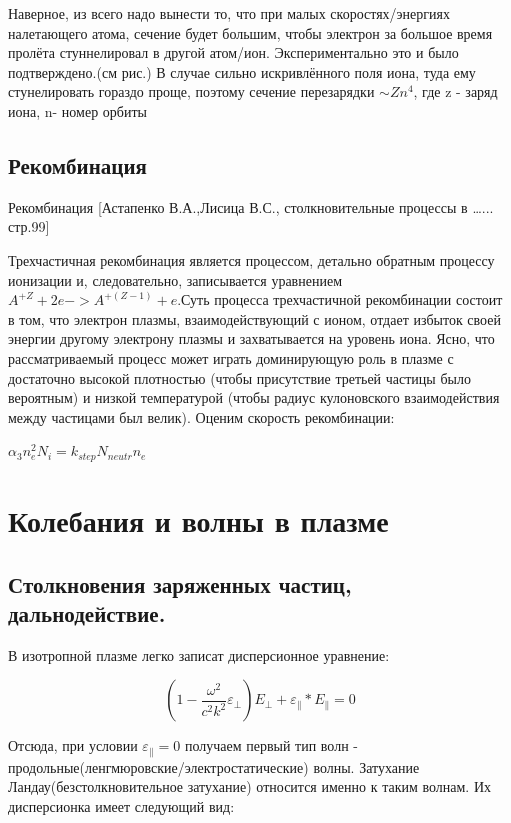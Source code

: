 \documentclass[10pt, a4paper]{article}
\begin{document}
Наверное, из всего надо вынести то, что при малых скоростях/энергиях налетающего атома, сечение будет большим, чтобы электрон за большое время пролёта стуннелировал в другой атом/ион. Экспериментально это и было подтверждено.(см рис.) В случае сильно искривлённого поля иона, туда ему стунелировать гораздо проще, поэтому сечение перезарядки $\sim Zn^{4}$, где z - заряд иона, n- номер орбиты

\subsection{Рекомбинация}
\label{sec.2.6}
Рекомбинация [Астапенко В.А.,Лисица В.С., столкновительные процессы в …... стр.99]


Трехчастичная рекомбинация является процессом, детально обратным процессу ионизации и, следовательно, записывается уравнением $A^{+Z} + 2e -> A^{+(Z-1)} + e $.Суть процесса трехчастичной рекомбинации состоит в том, что электрон плазмы, взаимодействующий с ионом, отдает избыток своей энергии другому электрону плазмы и захватывается на  уровень иона. Ясно, что рассматриваемый процесс может играть доминирующую роль в плазме с достаточно высокой плотностью (чтобы присутствие третьей частицы было вероятным) и низкой температурой (чтобы радиус кулоновского взаимодействия между частицами был велик). Оценим скорость рекомбинации:

$\alpha_3 n^2_e N_i = k_{step} N_{neutr} n_e$
\section{Колебания и волны в плазме}
\label{sec.7}

\subsection{Столкновения заряженных частиц, дальнодействие.}
\label{sec.2.1}
В изотропной плазме легко записат дисперсионное уравнение:

\begin{equation}
    \label{eq.Disp1}
    \left(1-\frac{\omega^2}{c^2 k^2} \varepsilon_{\perp}\right) E_{\perp} + \varepsilon_{\parallel} * E_{\parallel}= 0
\end{equation}

Отсюда, при условии $\varepsilon_{\parallel} = 0$ получаем первый тип волн - продольные(ленгмюровские/электростатические) 
волны. Затухание Ландау(безстолкновительное затухание) относится именно к таким волнам. Их дисперсионка имеет следующий
вид:
\end{document}
